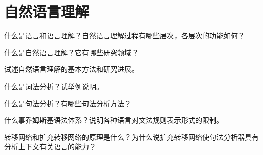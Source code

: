 \chapter{自然语言理解}

\begin{question}
什么是语言和语言理解？自然语言理解过程有哪些层次，各层次的功能如何？
\end{question}
\begin{solution}
\end{solution}

\begin{question}
什么是自然语言理解？它有哪些研究领域？
\end{question}
\begin{solution}
\end{solution}

\begin{question}
试述自然语言理解的基本方法和研究进展。
\end{question}
\begin{solution}
\end{solution}

\begin{question}
什么是词法分析？试举例说明。
\end{question}
\begin{solution}
\end{solution}

\begin{question}
什么是句法分析？有哪些句法分析方法？
\end{question}
\begin{solution}
\end{solution}

\begin{question}
什么事乔姆斯基语法体系？说明各种语言对文法规则表示形式的限制。
\end{question}
\begin{solution}
\end{solution}

\begin{question}
转移网络和扩充转移网络的原理是什么？为什么说扩充转移网络使句法分析器具有分析上下文有关语言的能力？
\end{question}
\begin{solution}
\end{solution}

